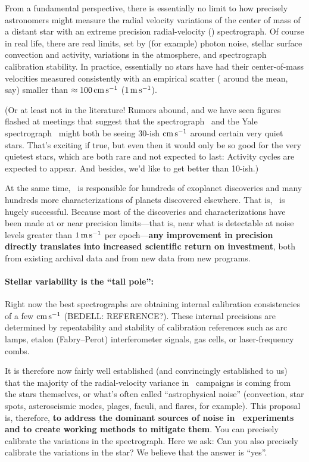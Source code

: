 \documentclass[12pt, letterpaper]{article}
\begin{document}
\sloppy\sloppypar\raggedbottom\frenchspacing


\noindent
From a fundamental perspective, there is essentially no limit to how
precisely astronomers might measure the radial velocity variations
of the center of mass
of a distant star with an extreme precision radial-velocity (\EPRV) spectrograph.
Of course in real life, there are real limits, set
by (for example) photon noise, stellar surface convection and activity,
variations in the atmosphere, and spectrograph calibration stability.
In practice, essentially no stars have had their center-of-mass
velocities measured consistently with an empirical scatter
( around the mean, say) smaller than $\approx 100\,{\mathrm{cm\,s^{-1}}}$ ($1\,{\mathrm{m\,s^{-1}}}$).

(Or at least not in the literature! Rumors abound, and we have seen
figures flashed at meetings that suggest that the  spectrograph
\ESPRESSO\ and the Yale spectrograph \EXPRES\ might both
be seeing 30-ish ${\mathrm{cm\,s^{-1}}}$ around certain very quiet stars. That's exciting
if true, but even then it would only be so good for the very quietest stars, which
are both rare and not expected to last: Activity cycles are expected to
appear. And besides, we'd like to get better than 10-ish.)

At the same time, \EPRV\ is responsible for hundreds of  exoplanet discoveries and many hundreds more  characterizations of planets discovered elsewhere.
That is, \EPRV\ is hugely successful.
Because most of the discoveries and characterizations have been made
at or near precision limits---that is, near what is detectable at noise levels
greater than $1\,{\mathrm{m\,s^{-1}}}$ per epoch---\textbf{any improvement in precision directly
translates into increased scientific return on investment},
both from existing archival data and from new data from new programs.

\paragraph{Stellar variability is the ``tall pole'':}
Right now the best spectrographs are obtaining internal calibration
consistencies of a few ${\mathrm{cm\,s^{-1}}}$ (BEDELL: REFERENCE?).
These internal precisions are determined by repeatability and
stability of calibration references such as arc lamps, etalon
(Fabry--Perot) interferometer signals, gas cells, or laser-frequency
combs.

It is therefore now fairly well established (and convincingly
established to us) that the majority of the radial-velocity variance
in \EPRV\ campaigns is coming from the stars themselves, or what's
often called ``astrophysical noise'' (convection, star spots,
asteroseismic modes, plages, faculi, and flares, for example).
This proposal is, therefore, \textbf{to address the dominant sources of
  noise in \EPRV\ experiments and to create working methods to
  mitigate them}.
You can precisely calibrate the variations in the spectrograph.
Here we ask: Can you also precisely calibrate the variations in the star?
We believe that the answer is ``yes''.
\end{document}
